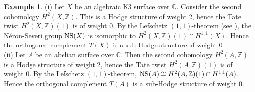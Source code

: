 \documentclass[reqno,a4paper,11pt]{amsart}
\theoremstyle{definition}
\theoremstyle{definition}
\newtheorem{exmp}[dfn]{Example}
\begin{document}
\begin{exmp}
    (i) Let $X$ be an algebraic  K3 surface over $\mathbb{C}$. Consider the second  cohomology $H^{2}(X, \mathbb{Z})$. This is a Hodge structure of weight $2$, hence the Tate twist $H^{2}(X, \mathbb{Z})(1)$ is of weight 0. By the Lefschetz $(1, 1)$-theorem (see  \cite[Chapter III, Proposition 3.3.2]{Huy2}), the N\'eron-Severi group ${\rm NS}(X)$ is isomorphic to $H^{2}(X, \mathbb{Z})(1)\cap H^{1,1}(X)$. Hence the orthogonal complement $T(X)$ is a sub-Hodge structure of weight $0$.
    \\\indent (ii) Let $A$ be an abelian surface over $\mathbb{C}$. Then the second cohomology $H^{2}(A, \mathbb{Z})$ is a Hodge structure of weight $2$, hence the Tate twist $H^{2}(A, \mathbb{Z})(1)$ is of weight 0. By the Lefschetz $(1, 1)$-theorem, ${\rm NS}(A)\cong H^{2}(A, \mathbb{Z})(1)\cap H^{1, 1}(A)$. Hence the orthogonal complement $T(A)$ is a sub-Hodge structure of weight $0$. 
    \end{exmp}
    ~\\
\end{document}
